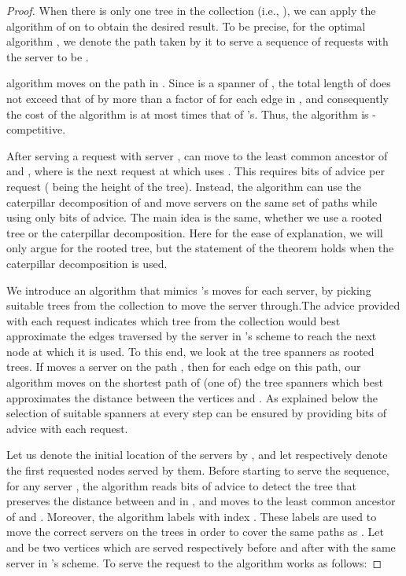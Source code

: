 \begin{proof} 
When there is only one tree  in the collection (i.e., ), we can apply the \pc algorithm of \cite{WAOA11} on  to obtain the desired result. To be precise, 
for the optimal algorithm \opt, we denote the path taken by it to serve a sequence of requests with the server  to be .



\pc algorithm moves  on the path  in . Since 
 is a spanner of , the total length of  does not exceed that of  by more than a factor of  for each edge in , and consequently the cost of 
the algorithm is at most  times that of {\opt}'s. Thus, the algorithm is -competitive. 

After serving a request  with server , \pc can move  to the least common ancestor of  and , where  is the next request at which \opt uses . This 
requires  bits of advice per request ( being the height of the tree). Instead, the algorithm can use the caterpillar decomposition of  
and move servers on the same set of paths while using only  bits of advice. The main idea is the same, whether we use a rooted tree or the caterpillar decomposition. Here for the ease of explanation, we will only argue for the rooted tree, but the 
statement of the theorem holds when the caterpillar decomposition is used. 

We introduce an algorithm that mimics  \opt's moves for each server,  by picking suitable trees from the collection to move the server through.The advice provided with each request indicates which tree from the collection would best approximate the 
edges traversed by the server in \OPT's scheme to reach the next node at which it is used. To this end, we look at the tree spanners as rooted trees. If \opt moves a server  on the path , then for each edge  on this path, our algorithm moves  on the shortest path of (one of) the tree spanners which best 
approximates the distance between the vertices  and .  As explained below the selection of suitable spanners at every step can be ensured by providing  bits of advice with each request.

Let us denote the initial location of the  servers by , and let  respectively denote the first requested nodes 
served by them. Before starting to serve the sequence, for any server , the algorithm reads  bits of advice to detect the 
tree  that preserves the distance between  and  in , and moves  to the least common ancestor of  and . 
Moreover, the algorithm labels  with index . These labels are used to move the correct servers on the trees in order to cover the same paths as \opt. Let  and 
 be two vertices which are served respectively before and after  with the same server in \opt's scheme. To serve the request to  the algorithm works as 
follows:


\end{proof}
